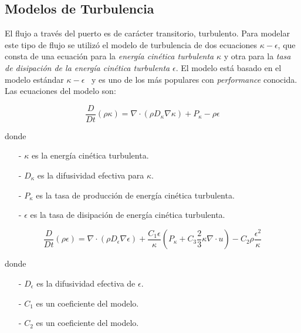\subsection{Modelos de Turbulencia}
%
El flujo a través del puerto es de carácter transitorio, turbulento.
%
Para modelar este tipo de flujo se utilizó el modelo de turbulencia de dos
ecuaciones \emph{$\kappa-\epsilon$}\parencite{wilcox}, que consta de una
ecuación para la \emph{energía cinética turbulenta} $\kappa$ y otra para la
\emph{tasa de disipación de la energía cinética turbulenta} $\epsilon$.
%
El modelo está basado en el modelo estándar
$\kappa-\epsilon$~\parencite{launderSpalding} y es uno de los más populares con
\emph{performance} conocida.
%
Las ecuaciones del modelo son:

\begin{equation}\label{eq:k}
  \frac{D}{Dt}(\rho \kappa) = \nabla \cdot (\rho D_{\kappa}\nabla \kappa) + P_{\kappa} - \rho \epsilon
\end{equation}


donde

\begin{itemize}
  \item[-] $\kappa$ es la energía cinética turbulenta.
  \item[-] $D_{\kappa}$ es la difusividad efectiva para $\kappa$.
  \item[-] $P_{\kappa}$ es la tasa de producción de energía cinética turbulenta.
  \item[-] $\epsilon$ es la tasa de disipación de energía cinética turbulenta.
\end{itemize}


\begin{equation}\label{eq:k}
  \frac{D}{Dt}(\rho \epsilon) =
  \nabla \cdot (\rho D_{\epsilon}\nabla \epsilon) +
  \frac{C_{1}\epsilon}{\kappa} \left( P_{\kappa}+C_{3}\frac{2}{3}\kappa\nabla\cdot u \right) -
  C_{2}\rho\frac{\epsilon^{2}}{\kappa}
\end{equation}

donde
\begin{itemize}
  \item[-] $D_{\epsilon}$ es la difusividad efectiva de $\epsilon$.
  \item[-] $C_{1}$ es un coeficiente del modelo.
  \item[-] $C_{2}$ es un coeficiente del modelo.
\end{itemize}

